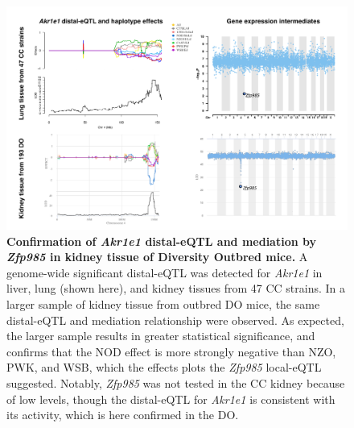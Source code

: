 \documentclass[9pt,twocolumn,twoside]{gsajnl}
\begin{document}
\begin{figure}[hp]
\renewcommand{\familydefault}{\sfdefault}\normalfont
\centering
\includegraphics[width=\textwidth, trim={0in 0in 0in 0in}, clip]{figs/do_confirmation_akr1e1.pdf}
\caption{\textbf{Confirmation of \textit{Akr1e1} distal-eQTL and mediation by \textit{Zfp985} in kidney tissue of Diversity Outbred mice.} A genome-wide significant distal-eQTL was detected for \textit{Akr1e1} in liver, lung (shown here), and kidney tissues from 47 CC strains. In a larger sample of kidney tissue from outbred DO mice, the same distal-eQTL and mediation relationship were observed. As expected, the larger sample results in greater statistical significance, and confirms that the NOD effect is more strongly negative than NZO, PWK, and WSB, which the effects plots the \textit{Zfp985} local-eQTL suggested. Notably, \textit{Zfp985} was not tested in the CC kidney because of low levels, though the distal-eQTL for \textit{Akr1e1} is consistent with its activity, which is here confirmed in the DO.
\label{fig:do_akr1e1}}
\end{figure}
\end{document}
